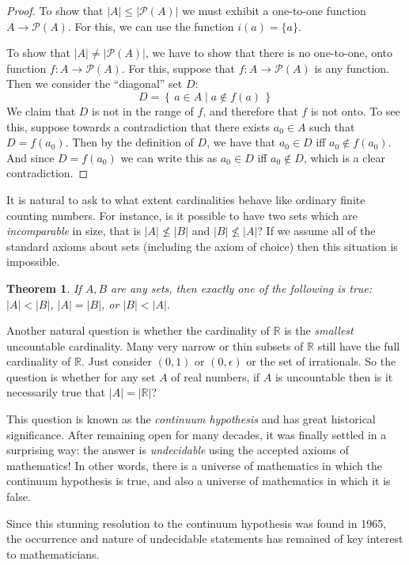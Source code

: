\documentclass[11pt,oneside]{amsbook}
\newcommand{\set}[1]{\left\{\,#1\,\right\}}
\newcommand{\R}{\mathbb R}
\theoremstyle{definition}
\theoremstyle{plain}
\newtheorem{theorem}{Theorem}[section]
\theoremstyle{definition}
\theoremstyle{remark}
\numberwithin{equation}{section}
\numberwithin{figure}{section}
\begin{document}
\begin{proof}
  To show that $|A|\leq|\mathcal P(A)|$ we must exhibit a one-to-one function $A\to\mathcal P(A)$. For this, we can use the function $i(a)=\{a\}$.

  To show that $|A|\neq|\mathcal P(A)|$, we have to show that there is no one-to-one, onto function $f\colon A\to\mathcal P(A)$. For this, suppose that $f\colon A\to\mathcal P(A)$ is any function. Then we consider the ``diagonal'' set $D$:
  \[D=\set{a\in A\mid a\notin f(a)}
  \]
  We claim that $D$ is not in the range of $f$, and therefore that $f$ is not onto. To see this, suppose towards a contradiction that there exists $a_0\in A$ such that $D=f(a_0)$. Then by the definition of $D$, we have that $a_0\in D$ iff $a_0\notin f(a_0)$. And since $D=f(a_0)$ we can write this as $a_0\in D$ iff $a_0\notin D$, which is a clear contradiction.
\end{proof}

It is natural to ask to what extent cardinalities behave like ordinary finite counting numbers. For instance, is it possible to have two sets which are \emph{incomparable} in size, that is $|A|\not\leq|B|$ and $|B|\not\leq|A|$? If we assume all of the standard axioms about sets (including the axiom of choice) then this situation is impossible.

\begin{theorem}
  If $A,B$ are any sets, then exactly one of the following is true: $|A|<|B|$, $|A|=|B|$, or $|B|<|A|$.
\end{theorem}

Another natural question is whether the cardinality of $\R$ is the \emph{smallest} uncountable cardinality. Many very narrow or thin subsets of $\R$ still have the full cardinality of $\R$. Just consider $(0,1)$ or $(0,\epsilon)$ or the set of irrationals. So the question is whether for any set $A$ of real numbers, if $A$ is uncountable then is it necessarily true that $|A|=|\R|$?

This question is known as the \emph{continuum hypothesis} and has great historical significance. After remaining open for many decades, it was finally settled in a surprising way: the answer is \emph{undecidable} using the accepted axioms of mathematics! In other words, there is a universe of mathematics in which the continuum hypothesis is true, and also a universe of mathematics in which it is false.

Since this stunning resolution to the continuum hypothesis was found in 1965, the occurrence and nature of undecidable statements has remained of key interest to mathematicians.
\end{document}
